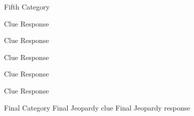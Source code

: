 \begin{category}{Fifth Category}
  \begin{clue}
    Clue
  \response
    Response
  \end{clue}

  \begin{clue}
    Clue
  \response
    Response
  \end{clue}

  \begin{clue}
    Clue
  \response
    Response
  \end{clue}

  \begin{clue}
    Clue
  \response
    Response
  \end{clue}

  \begin{clue}
    Clue
  \response
    Response
  \end{clue}
\end{category}

\begin{final}{Final Category}
  Final Jeopardy clue
\response
  Final Jeopardy response
\end{final}


